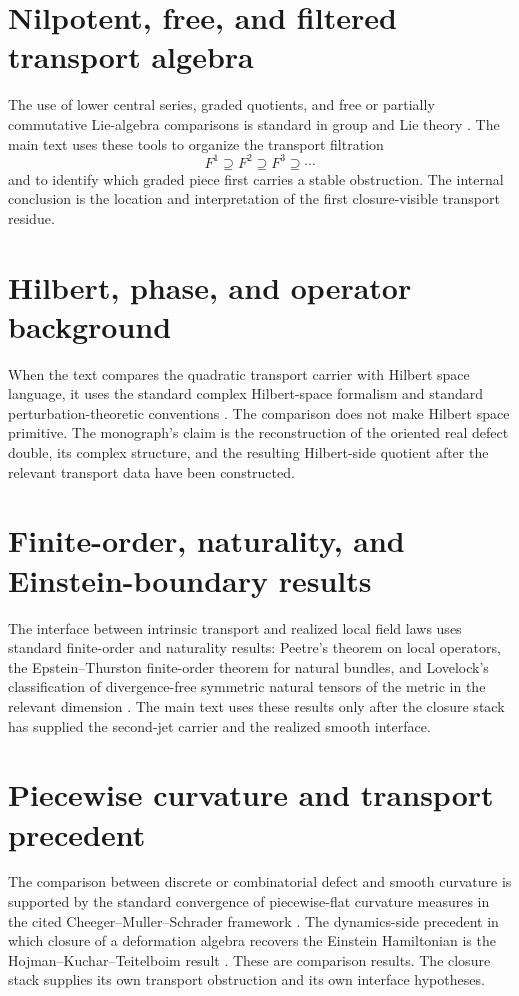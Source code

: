\section{Nilpotent, free, and filtered transport algebra}
\label{app:standard-filtered}
The use of lower central series, graded quotients, and free or partially
commutative Lie-algebra comparisons is standard in group and Lie theory
\cite{Hall1959,Malcev1949,Magnus1935,Witt1937,Labute1970,DuchampKrob1992}.
The main text uses these tools to organize the transport filtration
\[
	F^1\supseteq F^2\supseteq F^3\supseteq\cdots
\]
and to identify which graded piece first carries a stable obstruction.
The internal conclusion is the location and interpretation of the first
closure-visible transport residue.

\section{Hilbert, phase, and operator background}
\label{app:standard-hilbert}
When the text compares the quadratic transport carrier with Hilbert
space language, it uses the standard complex Hilbert-space formalism and
standard perturbation-theoretic conventions
\cite{VonNeumann1955,Kato1995}.  The comparison does not make Hilbert
space primitive.  The monograph's claim is the reconstruction of the
oriented real defect double, its complex structure, and the resulting
Hilbert-side quotient after the relevant transport data have been
constructed.

\section{Finite-order, naturality, and Einstein-boundary results}
\label{app:standard-finite-order}
The interface between intrinsic transport and realized local field laws
uses standard finite-order and naturality results: Peetre's theorem on
local operators, the Epstein--Thurston finite-order theorem for natural
bundles, and Lovelock's classification of divergence-free symmetric
natural tensors of the metric in the relevant dimension
\cite{Peetre1959,EpsteinThurston1979,Lovelock1971}.  The main text uses
these results only after the closure stack has supplied the
second-jet carrier and the realized smooth interface.

\section{Piecewise curvature and transport precedent}
\label{app:standard-piecewise}
The comparison between discrete or combinatorial defect and smooth
curvature is supported by the standard convergence of piecewise-flat
curvature measures in the cited Cheeger--Muller--Schrader framework
\cite{CheegerMullerSchrader1984}.  The dynamics-side precedent in which
closure of a deformation algebra recovers the Einstein Hamiltonian is
the Hojman--Kuchar--Teitelboim result \cite{HojmanKucharTeitelboim1976}.
These are comparison results.  The closure stack supplies its own
transport obstruction and its own interface hypotheses.


